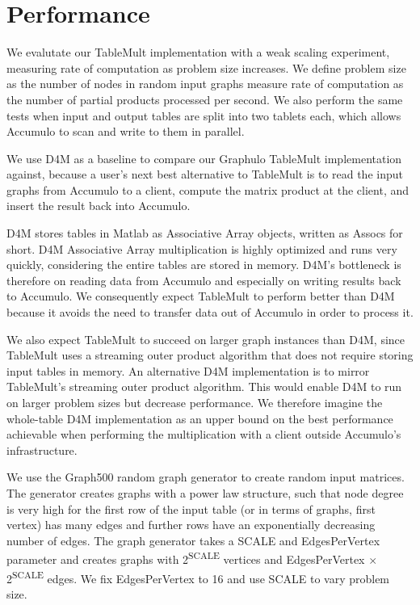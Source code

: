 
\section{Performance}
\label{sPerformance}

We evalutate our TableMult implementation with a weak scaling experiment,
measuring rate of computation as problem size increases.
We define problem size as the number of nodes in random input graphs
measure rate of computation as the number of partial products processed per second.  
We also perform the same tests when input and output tables
are split into two tablets each, which allows Accumulo to scan and write to them in parallel.


We use D4M as a baseline to compare our Graphulo TableMult implementation against, because 
a user's next best alternative to TableMult is to read the input graphs from Accumulo to a client, 
compute the matrix product at the client, and insert the result back into Accumulo.

D4M stores tables in Matlab as Associative Array objects, written as Assocs for short.  
D4M Associative Array multiplication is highly
optimized and runs very quickly, considering the entire tables are stored in memory. D4M's bottleneck is
therefore on reading data from Accumulo and especially on writing results back to Accumulo.
We consequently expect TableMult to perform better than D4M because it avoids the need to transfer data out of Accumulo 
in order to process it. 

We also expect TableMult to succeed on larger graph instances than D4M, since TableMult
uses a streaming outer product algorithm that does not require storing input tables in memory.
An alternative D4M implementation is to mirror TableMult's streaming outer product algorithm.
This would enable D4M to run on larger problem sizes but decrease performance.
We therefore imagine the whole-table D4M implementation as an upper bound on the best performance 
achievable when performing the multiplication with a client outside Accumulo's infrastructure.

We use the Graph500 random graph generator \cite{x} to create random input matrices. %
The generator creates graphs with a power law structure, such that node degree is very high for the 
first row of the input table (or in terms of graphs, first vertex) has many edges
and further rows have an exponentially decreasing number of edges.
The graph generator takes a SCALE and EdgesPerVertex parameter and creates graphs with 2\textsuperscript{SCALE} 
vertices and EdgesPerVertex $\times$ 2\textsuperscript{SCALE} edges.
We fix EdgesPerVertex to 16 and use SCALE to vary problem size. 


